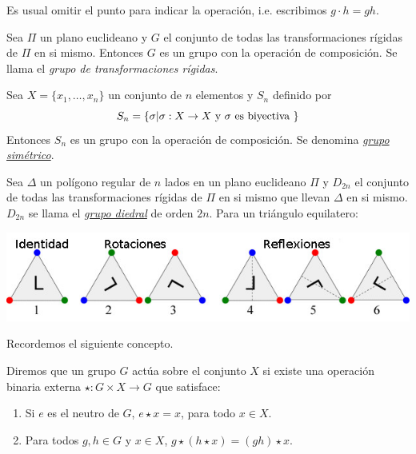 Es usual omitir el punto para indicar la operación, i.e. escribimos $g\cdot h=gh$.



\begin{ejemplo} Sea $\Pi$ un plano euclideano y $G$ el conjunto de todas las transformaciones rígidas de $\Pi$ en si mismo. Entonces $G$ es un grupo con la operación de composición. Se llama el \emph{grupo de transformaciones rígidas}.
 \end{ejemplo}


\begin{ejemplo}  Sea $X=\{x_1,\ldots,x_n\}$ un conjunto de $n$ elementos y $S_n$ definido por
\[S_n=\{\sigma|\sigma:X\to X\hbox{ y }\sigma \hbox{ es biyectiva }\}\]
Entonces $S_n$ es un grupo  con la operación de composición. Se denomina \href{http://es.wikipedia.org/wiki/Grupo_simétrico}{\emph{grupo simétrico}}.
 \end{ejemplo}

\begin{ejemplo} Sea $\Delta$ un polígono regular de $n$ lados  en un plano euclideano $\Pi$ y $D_{2n}$ el conjunto de todas las transformaciones rígidas de $\Pi$ en si mismo que llevan $\Delta$ en si mismo. $D_{2n}$ se llama el \href{http://es.wikipedia.org/wiki/Grupo_diedral}{\emph{grupo diedral}}  de orden $2n$. Para un triángulo equilatero:
\begin{center}
\includegraphics[scale=.4]{imagenes/SimTria.jpg}
\end{center}
\end{ejemplo}

Recordemos el siguiente concepto.

\begin{definicion}
Diremos que un grupo $G$ actúa sobre el conjunto $X$ si existe una operación binaria externa  $\star:G\times X\to G$ que satisface:
\begin{enumerate}
\item Si $e$ es el neutro de $G$, $e \star x=x$,  para todo $x\in X$.
\item Para todos $g,h\in G$ y $x\in X$,    $g\star (h\star x)=(gh)\star x$.
\end{enumerate}
\end{definicion}


